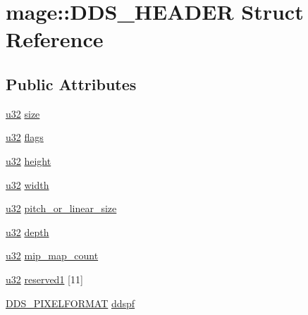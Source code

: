 \hypertarget{structmage_1_1_d_d_s___h_e_a_d_e_r}{}\section{mage\+:\+:D\+D\+S\+\_\+\+H\+E\+A\+D\+ER Struct Reference}
\label{structmage_1_1_d_d_s___h_e_a_d_e_r}
\subsection*{Public Attributes}
\begin{DoxyCompactItemize}
\item 
\hyperlink{namespacemage_af2b398bf98eb10351f49cad73fe2cc73}{u32} \hyperlink{structmage_1_1_d_d_s___h_e_a_d_e_r_a513edbbc173f64e6075a594350c188bf}{size}
\item 
\hyperlink{namespacemage_af2b398bf98eb10351f49cad73fe2cc73}{u32} \hyperlink{structmage_1_1_d_d_s___h_e_a_d_e_r_a6ae07ec6497b125ecf92b4a0d0c23408}{flags}
\item 
\hyperlink{namespacemage_af2b398bf98eb10351f49cad73fe2cc73}{u32} \hyperlink{structmage_1_1_d_d_s___h_e_a_d_e_r_a8b8493634b29fca5ed026f4dac7cce77}{height}
\item 
\hyperlink{namespacemage_af2b398bf98eb10351f49cad73fe2cc73}{u32} \hyperlink{structmage_1_1_d_d_s___h_e_a_d_e_r_a2e2e406d167a04116a5ff65bbc63db04}{width}
\item 
\hyperlink{namespacemage_af2b398bf98eb10351f49cad73fe2cc73}{u32} \hyperlink{structmage_1_1_d_d_s___h_e_a_d_e_r_aa4bfdfdbb7fbf05af92efaea24a95071}{pitch\+\_\+or\+\_\+linear\+\_\+size}
\item 
\hyperlink{namespacemage_af2b398bf98eb10351f49cad73fe2cc73}{u32} \hyperlink{structmage_1_1_d_d_s___h_e_a_d_e_r_a1a13eaedda1d4489e1d7d4aced09dcaf}{depth}
\item 
\hyperlink{namespacemage_af2b398bf98eb10351f49cad73fe2cc73}{u32} \hyperlink{structmage_1_1_d_d_s___h_e_a_d_e_r_aaf20d8e249696371058a880b9f224a04}{mip\+\_\+map\+\_\+count}
\item 
\hyperlink{namespacemage_af2b398bf98eb10351f49cad73fe2cc73}{u32} \hyperlink{structmage_1_1_d_d_s___h_e_a_d_e_r_a09e10e1d66daa4dbb5a592bc2719335d}{reserved1} \mbox{[}11\mbox{]}
\item 
\hyperlink{structmage_1_1_d_d_s___p_i_x_e_l_f_o_r_m_a_t}{D\+D\+S\+\_\+\+P\+I\+X\+E\+L\+F\+O\+R\+M\+AT} \hyperlink{structmage_1_1_d_d_s___h_e_a_d_e_r_af7a75b761a23052acab158294208b5d8}{ddspf}
\item 

\end{DoxyCompactItemize}
